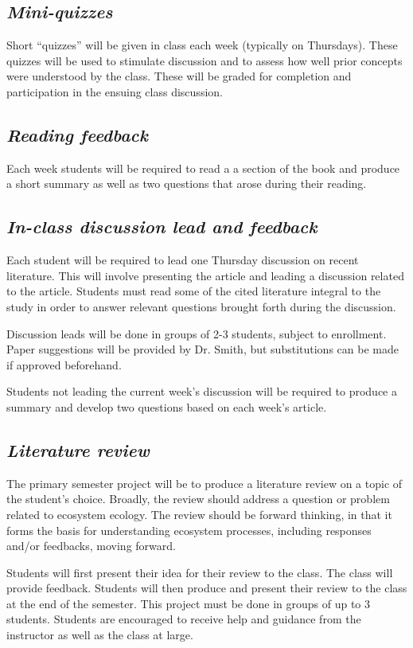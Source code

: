 \documentclass[12pt, notitlepage]{article}   	%
\begin{document}
{\subsection{\textit{Mini-quizzes}}
Short “quizzes” will be given in class each week (typically on Thursdays). 
These quizzes will be used to stimulate discussion and to assess how well 
prior concepts were understood by the class. 
These will be graded for completion and participation in the ensuing class discussion.

\subsection{\textit{Reading feedback}}
Each week students will be required to read a a section of the book 
and produce a short summary as well as two questions that arose during their 
reading. 

\subsection{\textit{In-class discussion lead and feedback}}
Each student will be required to lead one Thursday discussion on recent literature. 
This will involve presenting the article 
and leading a discussion related to the article. Students must read some of the cited
literature integral to the study 
in order to answer relevant questions brought forth during the discussion.

Discussion leads will be done in groups of 2-3 students, subject to enrollment. Paper
suggestions will be provided by Dr. Smith, but substitutions can be made if approved
beforehand.

Students not leading the current week’s 
discussion will be required to produce a summary and 
develop two questions based on each week’s article.

\subsection{\textit{Literature review}}
The primary semester project will be to produce a literature review on a topic 
of the student's choice.
Broadly, the review should address a question or problem related 
to ecosystem ecology. The review should be forward thinking, in that it forms the
basis for understanding ecosystem processes, including responses and/or feedbacks,
moving forward.

Students will first present their idea for their review 
to the class. The class will provide feedback. Students will then produce and present 
their review to the class at the end of the semester. This project must be done 
in groups of up to 3 students. Students are encouraged to receive help and guidance 
from the instructor as well as the class at large. 

}
\end{document}
